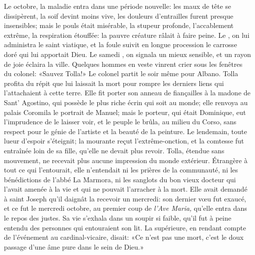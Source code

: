 Le  octobre, la maladie entra dans une période nouvelle: les maux de tête se dissipèrent, la soif devint moins vive, les douleurs d'entrailles furent presque insensibles; mais le pouls était misérable, la stupeur profonde, l'accablement extrême, la respiration étouffée: la pauvre créature râlait à faire peine. Le , on lui administra le saint viatique, et la foule suivit en longue procession le carrosse doré qui lui apportait Dieu. Le samedi , on signala un mieux sensible, et un rayon de joie éclaira la ville. Quelques hommes en veste vinrent crier sous les fenêtres du colonel: «Sauvez Tolla!» Le colonel partit le soir même pour Albano. Tolla profita du répit que lui laissait la mort pour rompre les derniers liens qui l'attachaient à cette terre. Elle fit porter son anneau de fiançailles à la madone de Sant' Agostino, qui possède le plus riche écrin qui soit au monde; elle renvoya au palais Coromila le portrait de Manuel; mais le porteur, qui était Dominique, eut l'imprudence de le laisser voir, et le peuple le brûla, au milieu du Corso, sans respect pour le génie de l'artiste et la beauté de la peinture. Le lendemain, toute lueur d'espoir s'éteignit; la mourante reçut l'extrême-onction, et la comtesse fut entraînée loin de sa fille, qu'elle ne devait plus revoir. Tolla, étendue sans mouvement, ne recevait plus aucune impression du monde extérieur. Étrangère à tout ce qui l'entourait, elle n'entendait ni les prières de la communauté, ni les bénédictions de l'abbé La Marmora, ni les sanglots du bon vieux docteur qui l'avait amenée à la vie et qui ne pouvait l'arracher à la mort. Elle avait demandé à saint Joseph qu'il daignât la recevoir un mercredi: son dernier v\oe{}u fut exaucé, et ce fut le mercredi  octobre, au premier coup de \emph{l'Ave Maria,} qu'elle entra dans le repos des justes. Sa vie s'exhala dans un soupir si faible, qu'il fut à peine entendu des personnes qui entouraient son lit. La supérieure, en rendant compte de l'événement au cardinal-vicaire, disait: «Ce n'est pas une mort, c'est le doux passage d'une âme pure dans le sein de Dieu.»

\enlargethispage{\baselineskip}

